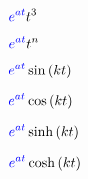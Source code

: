 \documentclass[multi={mymath},convert={density=1200}]{standalone}
\newenvironment{mymath}{$\displaystyle}{$}
\newcommand{\invLap}{\ensuremath{\mathscr{L}^{-1}}}
\begin{document}
\begin{mymath}
  {\color{blue}e^{at}}t^{3}
\end{mymath}

\begin{mymath}
  {\color{blue}e^{at}}t^{n}
\end{mymath}

\begin{mymath}
  {\color{blue}e^{at}}\sin\left(kt\right)
\end{mymath}

\begin{mymath}
  {\color{blue}e^{at}}\cos\left(kt\right)
\end{mymath}

\begin{mymath}
  {\color{blue}e^{at}}\sinh\left(kt\right)
\end{mymath}

\begin{mymath}
  {\color{blue}e^{at}}\cosh\left(kt\right)
\end{mymath}
\end{document}
